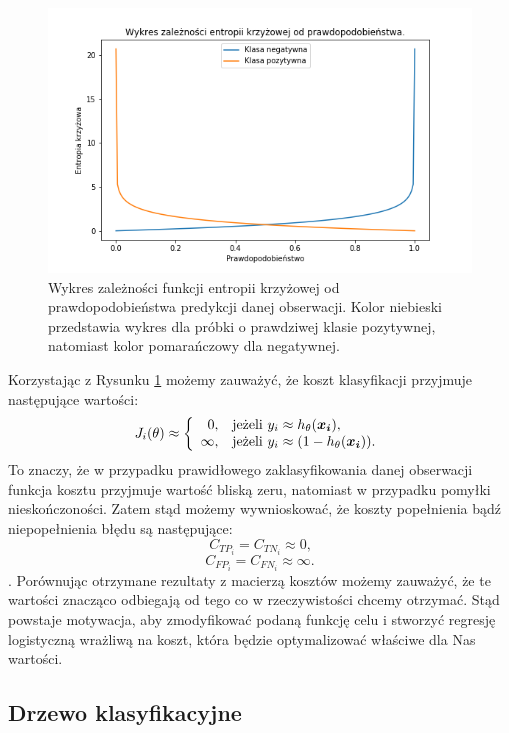 \documentclass[inzynierska]{pwr_wmat_praca_dyplomowa}
\theoremstyle{plain}
\numberwithin{theorem}{chapter}
\theoremstyle{definition}
\numberwithin{theorem}{chapter}
\begin{document}
\begin{figure}[h]
	\includegraphics[width=\linewidth]{images/cross_entropy.png}
	\caption{Wykres zależności funkcji entropii krzyżowej od prawdopodobieństwa predykcji danej obserwacji. Kolor niebieski przedstawia wykres dla próbki o prawdziwej klasie pozytywnej, natomiast kolor pomarańczowy dla negatywnej.}
	\label{fig:cross-entropy-plot}
\end{figure}

Korzystając z Rysunku \ref{fig:cross-entropy-plot} możemy zauważyć, że koszt klasyfikacji przyjmuje następujące wartości:
$$
J_i(\theta) \approx \left\{
\begin{array}{rl}
0, &\mbox{jeżeli $y_i \approx h_{\theta}(\boldsymbol{x_i})$}, \\
\infty, &\mbox{jeżeli $y_i \approx (1 - h_{\theta}(\boldsymbol{x_i}))$}.
\end{array}{}
\right.
$$
To znaczy, że w przypadku prawidłowego zaklasyfikowania danej obserwacji funkcja kosztu przyjmuje wartość bliską zeru, natomiast w przypadku pomyłki nieskończoności. Zatem stąd możemy wywnioskować, że koszty popełnienia bądź niepopełnienia błędu są następujące:
$$ C_{TP_i} = C_{TN_i} \approx 0 \text{,}$$
$$ C_{FP_i} = C_{FN_i} \approx \infty \text{.}$$.
Porównując otrzymane rezultaty z macierzą kosztów możemy zauważyć, że te wartości znacząco odbiegają od tego co w rzeczywistości chcemy otrzymać. Stąd powstaje motywacja, aby zmodyfikować podaną funkcję celu i stworzyć regresję logistyczną wrażliwą na koszt, która będzie optymalizować właściwe dla Nas wartości.

\subsection{Drzewo klasyfikacyjne}
\label{drzewo}
\end{document}
